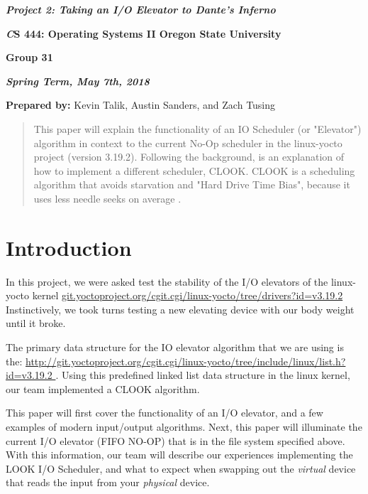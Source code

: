 \documentclass[onecolumn, draftclsnofoot,10pt, compsoc]{IEEEtran}
\def \ClassName{		CS 444: Operating Systems II }
\def \TeamNumber{		Group 31}
\def \GroupMemberOne{			Kevin Talik}
\def \GroupMemberTwo{			Austin Sanders}
\def \GroupMemberThree{			Zach Tusing}
\begin{document}
 	\begin{center}
	\huge\bf{ } 
   
    \large\textbf{\textit{ Project 2: Taking an I/O Elevator to Dante's Inferno }}\par
     
    
    
	\small{\bf\textit \ClassName Oregon State University}\par
    \small{\bf{\TeamNumber}}
    
    
    {\bf\textit{ Spring Term, May 7th, 2018} }
    
    
    {\small {\bf Prepared by:} \GroupMemberOne, \GroupMemberTwo, and \GroupMemberThree }
        \end{center}
 		\vfill
		\begin{abstract}
        This paper will explain the functionality of an IO Scheduler (or "Elevator") algorithm in context to the current No-Op scheduler in the linux-yocto project (version 3.19.2). Following the background, is an explanation of how to implement a different scheduler, CLOOK. CLOOK is a scheduling algorithm that avoids starvation and "Hard Drive Time Bias", because it uses less needle seeks on average \cite{iitDiskAlgs:1}.
        \end{abstract}
    
		
       \pagebreak
       \section{Introduction }
		 In this project, we were asked test the stability of the I/O elevators of the linux-yocto kernel \url{git.yoctoproject.org/cgit.cgi/linux-yocto/tree/drivers?id=v3.19.2}
          Instinctively, we took turns testing a new elevating device with our body weight until it broke. 

		 The primary data structure for the IO elevator algorithm that we are using is the: \url{http://git.yoctoproject.org/cgit.cgi/linux-yocto/tree/include/linux/list.h?id=v3.19.2 }.
         Using this predefined linked list data structure in the linux kernel, our team implemented a CLOOK algorithm.


		 This paper will first cover the functionality of an I/O elevator, and a few examples of modern input/output algorithms. 
		 Next, this paper will illuminate the current I/O elevator (FIFO NO-OP) that is in the file system specified above. 
		 With this information, our team will describe our experiences implementing the LOOK I/O Scheduler, and what to expect when swapping out the \textit{virtual} device that reads the input from your \textit{physical} device.
\end{document}
